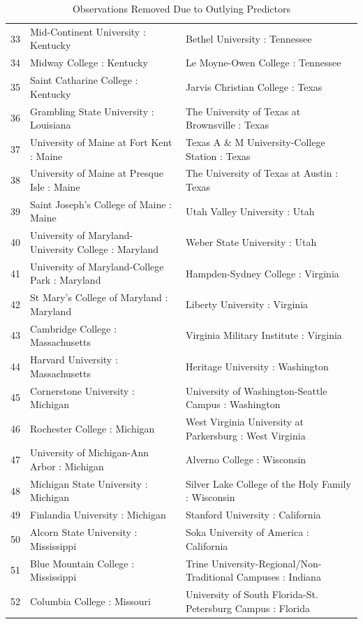 \documentclass{article}
\begin{document}
\begin{Schunk}
\begin{table}[ht]
\begin{tabular}{rll}
  33 & Mid-Continent University : Kentucky & Bethel University : Tennessee \\ 
  34 & Midway College : Kentucky & Le Moyne-Owen College : Tennessee \\ 
  35 & Saint Catharine College : Kentucky & Jarvis Christian College : Texas \\ 
  36 & Grambling State University : Louisiana & The University of Texas at Brownsville : Texas \\ 
  37 & University of Maine at Fort Kent : Maine & Texas A \& M University-College Station : Texas \\ 
  38 & University of Maine at Presque Isle : Maine & The University of Texas at Austin : Texas \\ 
  39 & Saint Joseph's College of Maine : Maine & Utah Valley University : Utah \\ 
  40 & University of Maryland-University College : Maryland & Weber State University : Utah \\ 
  41 & University of Maryland-College Park : Maryland & Hampden-Sydney College : Virginia \\ 
  42 & St Mary's College of Maryland : Maryland & Liberty University : Virginia \\ 
  43 & Cambridge College : Massachusetts & Virginia Military Institute : Virginia \\ 
  44 & Harvard University : Massachusetts & Heritage University : Washington \\ 
  45 & Cornerstone University : Michigan & University of Washington-Seattle Campus : Washington \\ 
  46 & Rochester College : Michigan & West Virginia University at Parkersburg : West Virginia \\ 
  47 & University of Michigan-Ann Arbor : Michigan & Alverno College : Wisconsin \\ 
  48 & Michigan State University : Michigan & Silver Lake College of the Holy Family : Wisconsin \\ 
  49 & Finlandia University : Michigan & Stanford University : California \\ 
  50 & Alcorn State University : Mississippi & Soka University of America : California \\ 
  51 & Blue Mountain College : Mississippi & Trine University-Regional/Non-Traditional Campuses : Indiana \\ 
  52 & Columbia College : Missouri & University of South Florida-St. Petersburg Campus : Florida \\ 
   \hline
\end{tabular}
\caption{Observations Removed Due to Outlying Predictors} 
\end{table}\end{Schunk}
\end{document}

